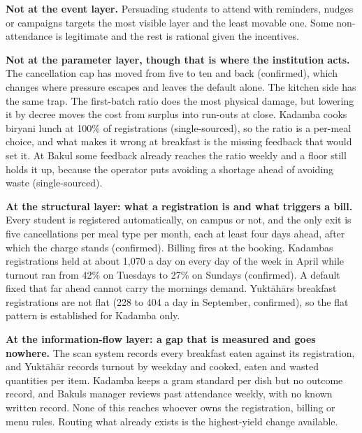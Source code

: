 \documentclass[
  10pt,
  table]{article}
\begin{document}
\textbf{Not at the event layer.} Persuading students to attend with reminders, nudges or campaigns targets the most visible layer and the least movable one. Some non-attendance is legitimate and the rest is rational given the incentives.

\textbf{Not at the parameter layer, though that is where the institution acts.} The cancellation cap has moved from five to ten and back (confirmed), which changes where pressure escapes and leaves the default alone. The kitchen side has the same trap. The first-batch ratio does the most physical damage, but lowering it by decree moves the cost from surplus into run-outs at close. Kadamba cooks biryani lunch at 100\% of registrations (single-sourced), so the ratio is a per-meal choice, and what makes it wrong at breakfast is the missing feedback that would set it. At Bakul some feedback already reaches the ratio weekly and a floor still holds it up, because the operator puts avoiding a shortage ahead of avoiding waste (single-sourced).

\textbf{At the structural layer: what a registration is and what triggers a bill.} Every student is registered automatically, on campus or not, and the only exit is five cancellations per meal type per month, each at least four days ahead, after which the charge stands (confirmed). Billing fires at the booking. Kadamba\textquotesingle s registrations held at about 1,070 a day on every day of the week in April while turnout ran from 42\% on Tuesdays to 27\% on Sundays (confirmed). A default fixed that far ahead cannot carry the morning\textquotesingle s demand. Yuktāhār\textquotesingle s breakfast registrations are not flat (228 to 404 a day in September, confirmed), so the flat pattern is established for Kadamba only.

\textbf{At the information-flow layer: a gap that is measured and goes nowhere.} The scan system records every breakfast eaten against its registration, and Yuktāhār records turnout by weekday and cooked, eaten and wasted quantities per item. Kadamba keeps a gram standard per dish but no outcome record, and Bakul\textquotesingle s manager reviews past attendance weekly, with no known written record. None of this reaches whoever owns the registration, billing or menu rules. Routing what already exists is the highest-yield change available.
\end{document}
